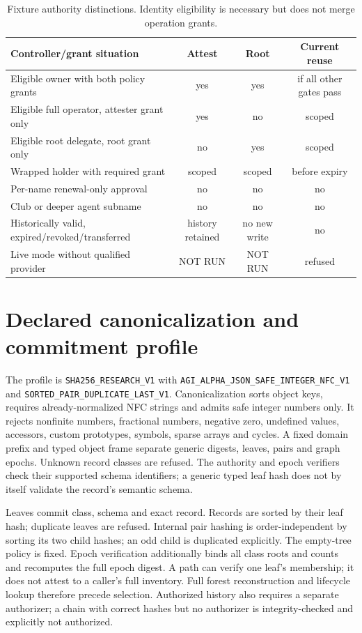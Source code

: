 \documentclass[11pt,a4paper]{article}
\newcommand{\code}[1]{\nolinkurl{#1}}
\begin{document}
\begin{table}[htbp]
\caption{Fixture authority distinctions. Identity eligibility is necessary but does not merge operation grants.}
\small
\begin{tabularx}{\linewidth}{Yccc}
\toprule Controller/grant situation & Attest & Root & Current reuse \\
\midrule
Eligible owner with both policy grants & yes & yes & if all other gates pass \\
Eligible full operator, attester grant only & yes & no & scoped \\
Eligible root delegate, root grant only & no & yes & scoped \\
Wrapped holder with required grant & scoped & scoped & before expiry \\
Per-name renewal-only approval & no & no & no \\
Club or deeper agent subname & no & no & no \\
Historically valid, expired/revoked/transferred & history retained & no new write & no \\
Live mode without qualified provider & NOT RUN & NOT RUN & refused \\
\bottomrule
\end{tabularx}
\end{table}

\section{Declared canonicalization and commitment profile}
\label{app:canonical}
The profile is \code{SHA256_RESEARCH_V1} with \code{AGI_ALPHA_JSON_SAFE_INTEGER_NFC_V1} and \code{SORTED_PAIR_DUPLICATE_LAST_V1}. Canonicalization sorts object keys, requires already-normalized NFC strings and admits safe integer numbers only. It rejects nonfinite numbers, fractional numbers, negative zero, undefined values, accessors, custom prototypes, symbols, sparse arrays and cycles. A fixed domain prefix and typed object frame separate generic digests, leaves, pairs and graph epochs. Unknown record classes are refused. The authority and epoch verifiers check their supported schema identifiers; a generic typed leaf hash does not by itself validate the record's semantic schema.

Leaves commit class, schema and exact record. Records are sorted by their leaf hash; duplicate leaves are refused. Internal pair hashing is order-independent by sorting its two child hashes; an odd child is duplicated explicitly. The empty-tree policy is fixed. Epoch verification additionally binds all class roots and counts and recomputes the full epoch digest. A path can verify one leaf's membership; it does not attest to a caller's full inventory. Full forest reconstruction and lifecycle lookup therefore precede selection. Authorized history also requires a separate authorizer; a chain with correct hashes but no authorizer is integrity-checked and explicitly not authorized.
\end{document}

